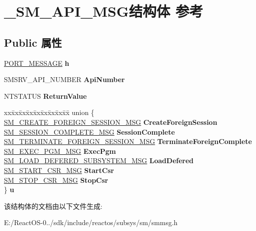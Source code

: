 \hypertarget{struct___s_m___a_p_i___m_s_g}{}\section{\+\_\+\+S\+M\+\_\+\+A\+P\+I\+\_\+\+M\+S\+G结构体 参考}
\label{struct___s_m___a_p_i___m_s_g}
\subsection*{Public 属性}
\begin{DoxyCompactItemize}
\item 
\mbox{\label{struct___s_m___a_p_i___m_s_g_abe56856bf615db9ed10d521d9f50e09d}} 
\hyperlink{struct___p_o_r_t___m_e_s_s_a_g_e___h_e_a_d_e_r}{P\+O\+R\+T\+\_\+\+M\+E\+S\+S\+A\+GE} {\bfseries h}
\item 
\mbox{\label{struct___s_m___a_p_i___m_s_g_ace0af2a5dd096c297794b14cb93a0585}} 
S\+M\+S\+R\+V\+\_\+\+A\+P\+I\+\_\+\+N\+U\+M\+B\+ER {\bfseries Api\+Number}
\item 
\mbox{\label{struct___s_m___a_p_i___m_s_g_a759094051be5ef0d08e03d43115017d1}} 
N\+T\+S\+T\+A\+T\+US {\bfseries Return\+Value}
\item 
\mbox{\label{struct___s_m___a_p_i___m_s_g_ad7acb7e0ccd3d6c77bf4ff730fd0be19}} 
\begin{tabbing}
xx\=xx\=xx\=xx\=xx\=xx\=xx\=xx\=xx\=\kill
union \{\\
\>\hyperlink{struct___s_m___c_r_e_a_t_e___f_o_r_e_i_g_n___s_e_s_s_i_o_n___m_s_g}{SM\_CREATE\_FOREIGN\_SESSION\_MSG} {\bfseries CreateForeignSession}\\
\>\hyperlink{struct___s_m___s_e_s_s_i_o_n___c_o_m_p_l_e_t_e___m_s_g}{SM\_SESSION\_COMPLETE\_MSG} {\bfseries SessionComplete}\\
\>\hyperlink{struct___s_m___t_e_r_m_i_n_a_t_e___f_o_r_e_i_g_n___s_e_s_s_i_o_n___m_s_g}{SM\_TERMINATE\_FOREIGN\_SESSION\_MSG} {\bfseries TerminateForeignComplete}\\
\>\hyperlink{struct___s_m___e_x_e_c___p_g_m___m_s_g}{SM\_EXEC\_PGM\_MSG} {\bfseries ExecPgm}\\
\>\hyperlink{struct___s_m___l_o_a_d___d_e_f_e_r_e_d___s_u_b_s_y_s_t_e_m___m_s_g}{SM\_LOAD\_DEFERED\_SUBSYSTEM\_MSG} {\bfseries LoadDefered}\\
\>\hyperlink{struct___s_m___s_t_a_r_t___c_s_r___m_s_g}{SM\_START\_CSR\_MSG} {\bfseries StartCsr}\\
\>\hyperlink{struct___s_m___s_t_o_p___c_s_r___m_s_g}{SM\_STOP\_CSR\_MSG} {\bfseries StopCsr}\\
\} {\bfseries u}\\

\end{tabbing}\end{DoxyCompactItemize}


该结构体的文档由以下文件生成\+:\begin{DoxyCompactItemize}
\item 
E\+:/\+React\+O\+S-\/0../sdk/include/reactos/subsys/sm/smmsg.\+h\end{DoxyCompactItemize}
